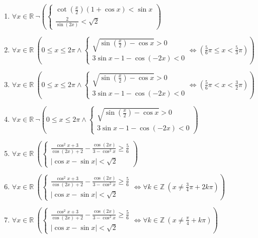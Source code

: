 \documentclass[11pt,a4paper]{article}
\begin{document}
\begin{enumerate}
\item $\displaystyle \forall x \in \mathbb{R}\ \lnot \left( \begin{cases} \cot\left(\frac{x}{2}\right)(1 + \cos x) < \sin x \\ \frac{2}{\sin\left(2x\right)} < \sqrt{2} \end{cases} \right)$
\item $\displaystyle \forall x \in \mathbb{R}\ \left( 0 \le x \le 2\pi \land \begin{cases} \sqrt{\sin\left(\frac{x}{2}\right) - \cos x} > 0 \\ 3\sin x - 1 - \cos\left(-2x\right) < 0 \end{cases} \iff \left( \frac{5}{6}\pi \le x < \frac{5}{3}\pi \right) \right)$
\item $\displaystyle \forall x \in \mathbb{R}\ \left( 0 \le x \le 2\pi \land \begin{cases} \sqrt{\sin\left(\frac{x}{2}\right) - \cos x} > 0 \\ 3\sin x - 1 - \cos\left(-2x\right) < 0 \end{cases} \iff \left( \frac{5}{6}\pi < x < \frac{3}{2}\pi \right) \right)$
\item $\displaystyle \forall x \in \mathbb{R}\ \lnot \left( 0 \le x \le 2\pi \land \begin{cases} \sqrt{\sin\left(\frac{x}{2}\right) - \cos x} > 0 \\ 3\sin x - 1 - \cos\left(-2x\right) < 0 \end{cases} \right)$
\item $\displaystyle \forall x \in \mathbb{R}\ \left( \begin{cases} \frac{\cos^{2} x + 3}{\cos\left(2x\right) + 2} - \frac{\cos\left(2x\right)}{3 - \cos^{2} x} \ge \frac{5}{6} \\ \left|\cos x - \sin x\right| < \sqrt{2} \end{cases} \right)$
\item $\displaystyle \forall x \in \mathbb{R}\ \left( \begin{cases} \frac{\cos^{2} x + 3}{\cos\left(2x\right) + 2} - \frac{\cos\left(2x\right)}{3 - \cos^{2} x} \ge \frac{5}{6} \\ \left|\cos x - \sin x\right| < \sqrt{2} \end{cases} \iff \forall k \in \mathbb{Z}\ \left( x \neq \frac{3}{4}\pi + 2k\pi \right) \right)$
\item $\displaystyle \forall x \in \mathbb{R}\ \left( \begin{cases} \frac{\cos^{2} x + 3}{\cos\left(2x\right) + 2} - \frac{\cos\left(2x\right)}{3 - \cos^{2} x} \ge \frac{5}{6} \\ \left|\cos x - \sin x\right| < \sqrt{2} \end{cases} \iff \forall k \in \mathbb{Z}\ \left( x \neq \frac{\pi}{4} + k\pi \right) \right)$

\end{enumerate}
\end{document}
